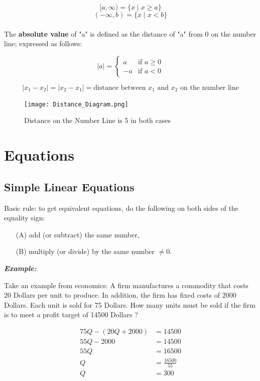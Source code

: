 \documentclass{article}
\begin{document}
\[ [a, \infty) = \{ x \mid x \geq a \} \]
\[ (-\infty, b) = \{ x \mid x < b \} \] \\

The \textbf{absolute value} of "a" is defined as the distance of "a" from 0 on the number line; expressed as follows: 

\begin{equation}
|a| = 
\begin{cases} 
a & \text{if } a \geq 0 \\
-a & \text{if } a < 0 
\end{cases}
\end{equation}

\begin{equation}
|x_1 - x_2| = |x_2 - x_1| = \text{distance between } x_1 \text{ and } x_2 \text{ on the number line}
\end{equation}

\begin{figure}[h]
\centering
\texttt{[image: Distance\_Diagram.png]}
\caption{Distance on the Number Line is 5 in both cases}
\label{fig:distance_diagram}
\end{figure}

\section{Equations}
\subsection{Simple Linear Equations}

Basic rule: to get equivalent equations, do the following on both sides of the equality sign: 
\begin{itemize}
\item[(A)] add (or subtract) the same number,
\item[(B)] multiply (or divide) by the same number $\neq 0$.
\end{itemize}

\textbf{\textit{Example:}}

Take an example from economics: A firm manufactures a commodity that costs 20 Dollars per unit to produce. In addition, the firm has fixed costs of 2000 Dollars. Each unit is sold for 75 Dollars. How many units must be sold if the firm is to meet a profit target of 14500 Dollars ?

\begin{align*}
75Q - (20Q + 2000) &= 14500 \\
55Q - 2000 &= 14500 \\
55Q &= 16500 \\
Q &= \frac{16500}{55} \\
Q &= 300
\end{align*}
\end{document}
